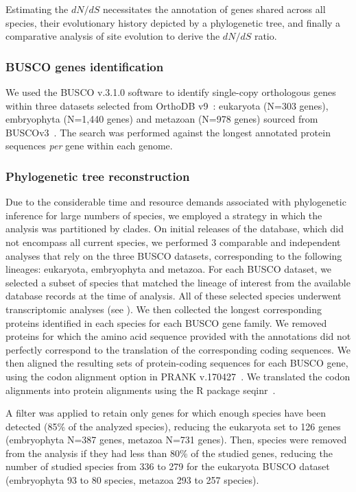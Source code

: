 Estimating the ${dN}/{dS}$ necessitates the annotation of genes shared across all species, their evolutionary history depicted by a phylogenetic tree, and finally a comparative analysis of site evolution to derive the ${dN}/{dS}$ ratio.

\subsubsection{BUSCO genes identification}
We used the \acrshort{BUSCO} v.3.1.0 software to identify single-copy orthologous genes within three datasets selected from OrthoDB v9~\citep{zdobnov_orthodb_2017}: eukaryota (N=303 genes), embryophyta (N=1,440 genes) and metazoan (N=978 genes) sourced from \acrshort{BUSCO}v3~\citep{waterhouse_busco_2018, seppey_busco_2019, manni_busco_2021}. The search was performed against the longest annotated protein sequences \textit{per} gene within each genome.

\subsubsection{Phylogenetic tree reconstruction}
Due to the considerable time and resource demands associated with phylogenetic inference for large numbers of species, we employed a strategy in which the analysis was partitioned by clades. 
On initial releases of the database, which did not encompass all current species, we performed 3 comparable and independent analyses that rely on the three \acrshort{BUSCO} datasets, corresponding to the following lineages: eukaryota, embryophyta and metazoa.
For each \acrshort{BUSCO} dataset, we selected a subset of species that matched the lineage of interest from the available database records at the time of analysis. All of these selected species underwent transcriptomic analyses (see ). We then collected the longest corresponding proteins identified in each species for each \acrshort{BUSCO} gene family. We removed proteins for which the amino acid sequence provided with the annotations did not perfectly correspond to the translation of the corresponding coding sequences. We then aligned the resulting sets of protein-coding sequences for each \acrshort{BUSCO} gene, using the codon alignment option in PRANK v.170427~\citep{loytynoja_phylogeny-aware_2008}. We translated the codon alignments into protein alignments using the R package seqinr~\citep{charif_seqinr_2007}.

A filter was applied to retain only genes for which enough species have been detected (85\% of the analyzed species), reducing the eukaryota set to 126 genes (embryophyta N=387 genes, metazoa N=731 genes). Then, species were removed from the analysis if they had less than 80\% of the studied genes, reducing the number of studied species from 336 to 279 for the eukaryota \acrshort{BUSCO} dataset (embryophyta 93 to 80 species, metazoa 293 to 257 species).

